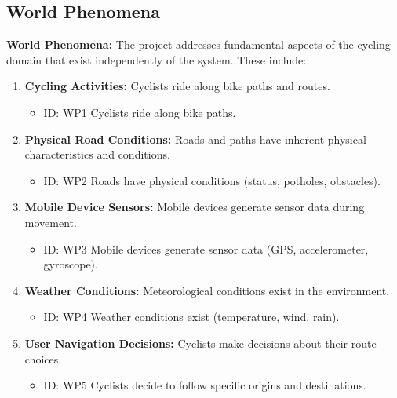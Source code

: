 \subsection{World Phenomena}
\label{subsec:world_phenomena}%
\setcounter{wp}{1}
\newcommand{\cwp}{\thewp\stepcounter{wp}}
\textbf{World Phenomena:} 
The project addresses fundamental aspects of the cycling domain that exist independently of the system. These include:
\begin{enumerate}
    \item \textbf{Cycling Activities:} Cyclists ride along bike paths and routes.
    \begin{itemize}
        \item ID: WP1 Cyclists ride along bike paths.
    \end{itemize}

    \item \textbf{Physical Road Conditions:} Roads and paths have inherent physical characteristics and conditions.
    \begin{itemize}
        \item ID: WP2 Roads have physical conditions (status, potholes, obstacles).
    \end{itemize}

    \item \textbf{Mobile Device Sensors:} Mobile devices generate sensor data during movement.
    \begin{itemize}
        \item ID: WP3 Mobile devices generate sensor data (GPS, accelerometer, gyroscope).
    \end{itemize}

    \item \textbf{Weather Conditions:} Meteorological conditions exist in the environment.
    \begin{itemize}
        \item ID: WP4 Weather conditions exist (temperature, wind, rain).
    \end{itemize}

    \item \textbf{User Navigation Decisions:} Cyclists make decisions about their route choices.
    \begin{itemize}
        \item ID: WP5 Cyclists decide to follow specific origins and destinations.
    \end{itemize}
\end{enumerate}

